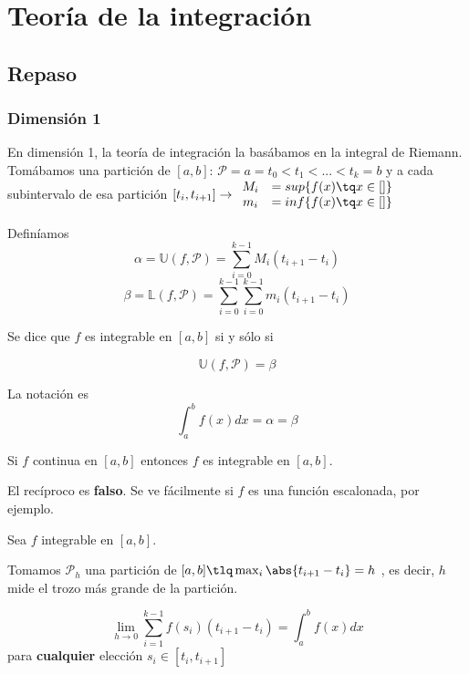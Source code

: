 \section{Teoría de la integración}

\subsection{Repaso}

\subsubsection{Dimensión 1}

En dimensión 1, la teoría de integración la basábamos en la integral de Riemann. Tomábamos una partición de $[a,b]$: $\mathcal{P} = a = t_0 < t_1<...<t_k = b$ y a cada subintervalo de esa partición $[t_i,t_{i+1}] \rightarrow \begin{array}{cc} 
M_i &= sup\{f(x)\tq x\in []\}\\
m_i &= inf \{f(x)\tq x\in []\}\end{array}$ 

Definíamos \[ \alpha = \mathbb{U}(f,\mathcal{P}) = \sum_{i=0}^{k-1} M_i(t_{i+1}-t_i)\]
\[ \beta = \mathbb{L}(f,\mathcal{P}) = \sum_{i=0}^{k-1} \sum_{i=0}^{k-1} m_i(t_{i+1}-t_i)\]

\begin{defn} Se dice que $f$ es integrable en $[a,b]$ si y sólo si 

\[ \mathbb{U}(f,\mathcal{P}) = \beta \] 

La notación es \[ \int_a^b f(x)dx = \alpha = \beta \]
\end{defn}

\begin{theorem}
Si $f$ continua en $[a,b]$ entonces  $f$ es integrable en $[a,b]$.
\end{theorem}

El recíproco es \textbf{falso}. Se ve fácilmente si $f$ es una función escalonada, por ejemplo.

\begin{theorem} Sea $f$ integrable en $[a,b]$.

Tomamos $\mathcal{P}_h$ una partición de $[a,b] \tlq \max_{i} \abs{t_{i+1}-t_i} = h$ , es decir, $h$ mide el trozo más grande de la partición.

\[ \lim_{h\rightarrow 0} \sum_{i=1}^{k-1} f(s_i)(t_{i+1}-t_i) = \int_a^bf(x)dx \] para \textbf{cualquier} elección $s_i\in[t_i,t_{i+1}]$	

\end{theorem} 

